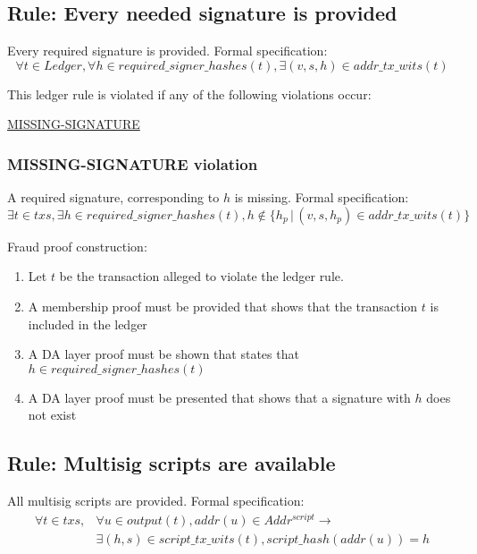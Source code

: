 \documentclass[../midgard.tex]{subfiles}
\begin{document}
\subsection{Rule: Every needed signature is provided}
\label{rule:every-needed-signature-is-provided}
Every required signature is provided.
Formal specification:
\begin{equation*}
    \forall t \in Ledger, \forall h \in required\_signer\_hashes(t), \exists (v, s, h) \in addr\_tx\_wits(t)
\end{equation*}
        
This ledger rule is violated if any of the following violations occur:
\begin{itemize-multi}
  \item \hyperref[violation:MISSING-SIGNATURE]{MISSING-SIGNATURE}
\end{itemize-multi}

\subsubsection{MISSING-SIGNATURE violation}
\label{violation:MISSING-SIGNATURE}
A required signature, corresponding to $h$ is missing.
Formal specification:
\begin{equation*}
    \exists t \in txs, \exists h \in required\_signer\_hashes(t), h \notin \{ h_p \, | \, (v, s, h_p) \in addr\_tx\_wits(t) \}
\end{equation*}

Fraud proof construction:
\begin{enumerate}
  \item Let $t$ be the transaction alleged to violate the ledger rule. 
  \item A membership proof must be provided that shows that the transaction $t$ is included in the ledger
  \item A DA layer proof must be shown that states that $h \in required\_signer\_hashes(t)$
  \item A DA layer proof must be presented that shows that a signature with $h$ does not exist
\end{enumerate}

\subsection{Rule: Multisig scripts are available}
\label{rule:multisig-scripts-are-available}
All multisig scripts are provided.
Formal specification:
\begin{equation*}
\begin{split}
  \forall t \in txs, & \forall u \in output(t), addr(u) \in Addr^{script} \rightarrow \\
  & \exists (h, s) \in script\_tx\_wits(t), script\_hash(addr(u)) = h
\end{split}
\end{equation*}
\end{document}
